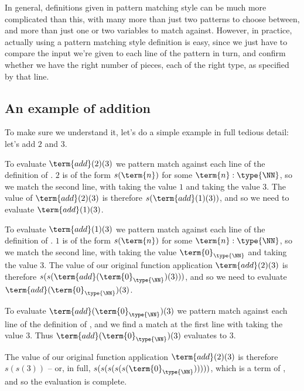 In general, definitions given in pattern matching style can be much more complicated than this, with many more than just two patterns to choose between, and more than just one or two variables to match against.  However, in practice, actually using a pattern matching style definition is easy, since we just have to compare the input we're given to each line of the pattern in turn, and confirm whether we have the right number of pieces, each of the right type, as specified by that line.





\subsection{An example of addition}
\label{sec:NaturalNumbers-ExampleAddition}

To make sure we understand it, let's do a simple example in full tedious detail: let's add $2$ and $3$.  %

To evaluate
$\term{add}(2)(3)$ we pattern match against each line of the definition of .  $2$ is of the form $s(\term{n})$ for some $\term{n}:\type{\NN}$, so we match the second line, with  taking the value $1$ and  taking the value $3$.  The value of $\term{add}(2)(3)$ is therefore 
$s(\term{add}(1)(3))$, and so we need to evaluate $\term{add}(1)(3)$.

To evaluate
$\term{add}(1)(3)$ we pattern match against each line of the definition of .  $1$ is of the form $s(\term{n})$ for some $\term{n}:\type{\NN}$, so we match the second line, with  taking the value $\term{0}_{\type{\NN}}$ and  taking the value $3$.  The value of our original function application $\term{add}(2)(3)$ is therefore 
$s(s(\term{add}(\term{0}_{\type{\NN}})(3)))$, and so we need to evaluate $\term{add}(\term{0}_{\type{\NN}})(3)$.

To evaluate
$\term{add}(\term{0}_{\type{\NN}})(3)$ we pattern match against each line of the definition of , and we find a match at the first line with  taking the value $3$.  Thus $\term{add}(\term{0}_{\type{\NN}})(3)$ evaluates to $3$.

The value of our original function application $\term{add}(2)(3)$ is therefore $s(s(3))$ -- or, in full, 
$s(s(s(s(s(\term{0}_{\type{\NN}})))))$, 
which is a term of \type{\NN}, and so the evaluation is complete.

